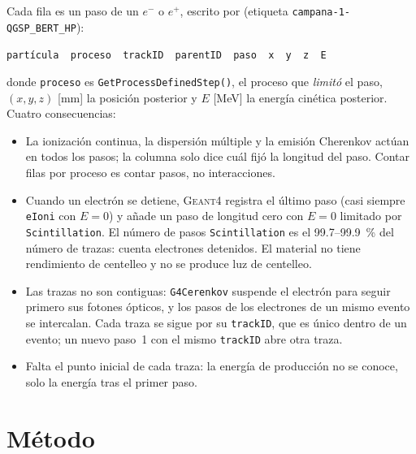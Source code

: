 \documentclass[11pt,a4paper]{article}
\newcommand{\var}[1]{\texttt{#1}}
\begin{document}
Cada fila es un paso de un $e^-$ o $e^+$, escrito por  (etiqueta \texttt{campana-1-QGSP\_BERT\_HP}):
\begin{center}
\texttt{partícula \ proceso \ trackID \ parentID \ paso \ x \ y \ z \ E}
\end{center}
donde \texttt{proceso} es \texttt{GetProcessDefinedStep()}, el proceso que \emph{limitó} el paso, $(x,y,z)$ [mm] la posición posterior y $E$ [MeV] la energía cinética posterior. Cuatro consecuencias:
\begin{itemize}
  \item La ionización continua, la dispersión múltiple y la emisión Cherenkov actúan en todos los pasos; la columna solo dice cuál fijó la longitud del paso. Contar filas por proceso es contar pasos, no interacciones.
  \item Cuando un electrón se detiene, \textsc{Geant4} registra el último paso (casi siempre \var{eIoni} con $E=0$) y añade un paso de longitud cero con $E=0$ limitado por \var{Scintillation}. El número de pasos \var{Scintillation} es el 99.7--99.9~\% del número de trazas: cuenta electrones detenidos. El material no tiene rendimiento de centelleo y no se produce luz de centelleo.
  \item Las trazas no son contiguas: \var{G4Cerenkov} suspende el electrón para seguir primero sus fotones ópticos, y los pasos de los electrones de un mismo evento se intercalan. Cada traza se sigue por su \var{trackID}, que es único dentro de un evento; un nuevo paso~1 con el mismo \var{trackID} abre otra traza.
  \item Falta el punto inicial de cada traza: la energía de producción no se conoce, solo la energía tras el primer paso.
\end{itemize}

\section{Método}
\label{sec:metodo}
\end{document}
